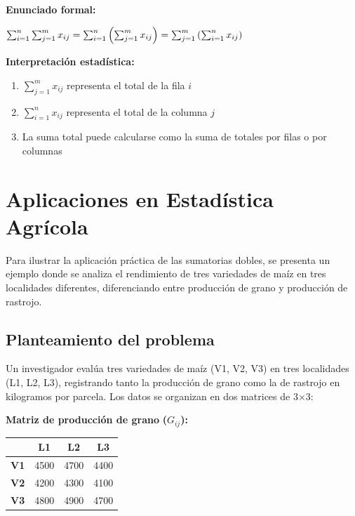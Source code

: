 \documentclass[
  spanish,
  letterpaper,
]{book}
\begin{document}
\textbf{Enunciado formal:}

\(\Large \sum_{i=1}^{n}\sum_{j=1}^{m} x_{ij} = \sum_{i=1}^{n}\left(\sum_{j=1}^{m} x_{ij}\right) = \sum_{j=1}^{m}\left(\sum_{i=1}^{n} x_{ij}\right)\)

\textbf{Interpretación estadística:}

\begin{enumerate}
\def\labelenumi{\arabic{enumi}.}
\item
  \(\sum_{j=1}^{m} x_{ij}\)\hspace{0pt} representa el total de la fila
  \(i\)
\item
  \(\sum_{i=1}^{n} x_{ij}\)\hspace{0pt} representa el total de la
  columna \(j\)
\item
  La suma total puede calcularse como la suma de totales por filas o por
  columnas
\end{enumerate}

\section{Aplicaciones en Estadística
Agrícola}\label{aplicaciones-en-estaduxedstica-agruxedcola}

Para ilustrar la aplicación práctica de las sumatorias dobles, se
presenta un ejemplo donde se analiza el rendimiento de tres variedades
de maíz en tres localidades diferentes, diferenciando entre producción
de grano y producción de rastrojo.

\subsection{Planteamiento del
problema}\label{planteamiento-del-problema}

Un investigador evalúa tres variedades de maíz (V1, V2, V3) en tres
localidades (L1, L2, L3), registrando tanto la producción de grano como
la de rastrojo en kilogramos por parcela. Los datos se organizan en dos
matrices de 3×3:

\textbf{Matriz de producción de grano} \textbf{(}\(G_{ij}\)\textbf{):}

\begin{longtable}[]{@{}cccc@{}}
\toprule\noalign{}
& L1 & L2 & L3 \\
\midrule\noalign{}
\endhead
\bottomrule\noalign{}
\endlastfoot
\textbf{V1} & 4500 & 4700 & 4400 \\
\textbf{V2} & 4200 & 4300 & 4100 \\
\textbf{V3} & 4800 & 4900 & 4700 \\
\end{longtable}
\end{document}
